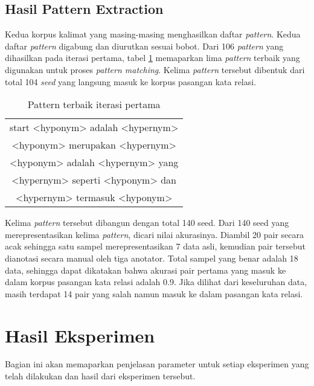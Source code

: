 \subsection{Hasil Pattern Extraction}
Kedua korpus kalimat yang masing-masing menghasilkan daftar \textit{pattern}. Kedua daftar \textit{pattern} digabung dan diurutkan sesuai bobot. Dari 106 \textit{pattern} yang dihasilkan pada iterasi pertama, tabel \ref{table:pattern1} memaparkan lima \textit{pattern} terbaik yang digunakan untuk proses \textit{pattern matching}. Kelima \textit{pattern} tersebut dibentuk dari total 104 \textit{seed} yang langsung masuk ke korpus pasangan kata relasi.
\begin{table}
  \centering
  \caption{Pattern terbaik iterasi pertama}
  \label{table:pattern1}
  \begin{tabular}{|c|}
    \hline
      start <hyponym> adalah <hypernym> \\
      <hyponym> merupakan <hypernym> \\ 
      <hyponym> adalah <hypernym> yang \\
      <hypernym> seperti <hyponym> dan \\
      <hypernym> termasuk <hyponym> \\ \hline
  \end{tabular}
\end{table}

Kelima \textit{pattern} tersebut dibangun dengan total 140 seed. Dari 140 seed yang merepresentasikan kelima \textit{pattern}, dicari nilai akurasinya. Diambil 20 pair secara acak sehingga satu sampel merepresentasikan 7 data asli, kemudian pair tersebut dianotasi secara manual oleh tiga anotator. Total sampel yang benar adalah 18 data, sehingga dapat dikatakan bahwa akurasi pair pertama yang masuk ke dalam korpus pasangan kata relasi adalah 0.9. Jika dilihat dari keseluruhan data, masih terdapat 14 pair yang salah namun masuk ke dalam pasangan kata relasi.


\section{Hasil Eksperimen}
Bagian ini akan memaparkan penjelasan parameter untuk setiap eksperimen yang telah dilakukan dan hasil dari eksperimen tersebut. 


